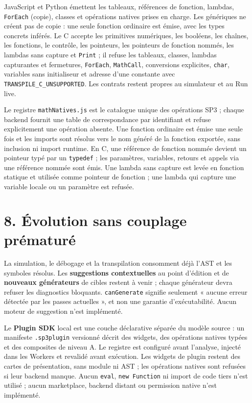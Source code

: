 \documentclass[11pt,a4paper]{article}
\newcommand{\code}[1]{\texttt{#1}}
\begin{document}
JavaScript et Python émettent les tableaux, références de fonction, lambdas, \code{ForEach} (copie), classes et opérations natives prises en charge. Les génériques ne créent pas de copie : une seule fonction ordinaire est émise, avec les types concrets inférés. Le C accepte les primitives numériques, les booléens, les chaînes, les fonctions, le contrôle, les pointeurs, les pointeurs de fonction nommés, les lambdas sans capture et \code{Print} ; il refuse les tableaux, classes, lambdas capturantes et fermetures, \code{ForEach}, \code{MathCall}, conversions explicites, \code{char}, variables sans initialiseur et adresse d'une constante avec \code{TRANSPILE\_C\_UNSUPPORTED}. Les contrats restent propres au simulateur et au Run live.

Le registre \code{mathNatives.js} est le catalogue unique des opérations SP3 ; chaque backend fournit une table de correspondance par identifiant et refuse explicitement une opération absente. Une fonction ordinaire est émise une seule fois et les imports sont résolus vers le nom généré de la fonction exportée, sans inclusion ni import runtime. En C, une référence de fonction nommée devient un pointeur typé par un \code{typedef} ; les paramètres, variables, retours et appels via une référence nommée sont émis. Une lambda sans capture est levée en fonction statique et utilisée comme pointeur de fonction ; une lambda qui capture une variable locale ou un paramètre est refusée.

\section*{8. Évolution sans couplage prématuré}
La simulation, le débogage et la transpilation consomment déjà l'AST et les
symboles résolus. Les \textbf{suggestions contextuelles} au point d'édition et
de \textbf{nouveaux générateurs} de cibles restent à venir ; chaque générateur
devra refuser les diagnostics bloquants. \code{canGenerate} signifie seulement
« aucune erreur détectée par les passes actuelles », et non une garantie
d'exécutabilité. Aucun moteur de suggestion n'est implémenté.

Le \textbf{Plugin SDK} local est une couche déclarative séparée du modèle
source : un manifeste \code{.sp3plugin} versionné décrit des widgets, des
opérations natives typées et des composites de niveau A. Le registre est
configuré avant l'analyse, injecté dans les Workers et revalidé avant
exécution. Les widgets de plugin restent des cartes de présentation, sans
module ni AST ; les opérations natives sont refusées si leur backend manque.
Aucun \code{eval}, \code{new Function} ni import de code tiers n'est utilisé ;
aucun marketplace, backend distant ou permission native n'est implémenté.
\end{document}
